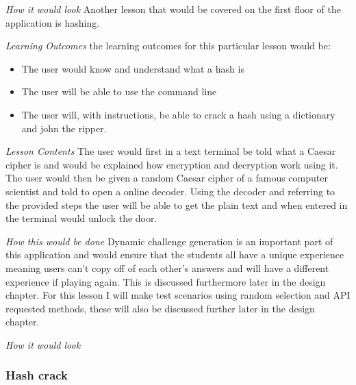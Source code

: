 \documentclass[12pt,a4paper]{article}
\begin{document}
\emph{How it would look} 
Another lesson that would be covered on the first floor of the application is hashing. 

\emph{Learning Outcomes} 
\newline the learning outcomes for this particular lesson would be:  

\begin{itemize}\itemsep0pt
	\item The user would know and understand what a hash is 
	\item The user will be able to use the command line 
	\item The user will, with instructions, be able to crack a hash using a dictionary and john the ripper. 
\end{itemize} 

\emph{Lesson Contents} 
\newline The user would first in a text terminal be told what a Caesar cipher is and would be explained how encryption and decryption work using it. The user would then be given a random Caesar cipher of a famous computer scientist and told to open a online decoder. Using the decoder and referring to the provided steps the user will be able to get the plain text and when entered in the terminal would unlock the door.  

\emph{How this would be done} 
\newline Dynamic challenge generation is an important part of this application and would ensure that the students all have a unique experience meaning users can't copy off of each other's answers and will have a different experience if playing again. This is discussed furthermore later in the design chapter. For this lesson I will make test scenarios using random selection and API requested methods, these will also be discussed further later in the design chapter. 

\emph{How it would look} 
 
 


 
\subsubsection{Hash crack}   
\end{document}
